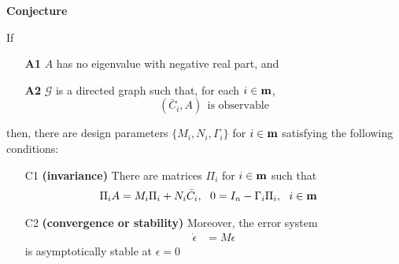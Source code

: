 \documentclass{beamer}
\begin{document}
\begin{frame}{\color{blue}\bf Conjecture }

If
\begin{itemize}
  \item [\bf A1] $A$ has no eigenvalue with negative real part, and
  \item [\bf A2] $\mathcal{G}$ is a directed graph such that, for each $i\in{\bf m}$,
\begin{equation*}
(\bar{C}_{i},A)  ~~\text{is observable}
\end{equation*}
\end{itemize}
then, there are design parameters $\{M_{i},N_{i},\Gamma_{i}\}$ for $i\in{\bf m}$ satisfying the following conditions:
\begin{itemize}
  \item [C1] \textbf{(invariance)} There are matrices $\Pi_{i}$ for $i\in{\bf m}$ such that
\begin{align*}
\Pi_{i}A&=M_{i}\Pi_{i}+ N_{i}\bar{C}_{i},~~ 0=I_{n}-\Gamma_{i}\Pi_{i},~~ i\in{\bf m}
\end{align*}
  \item [C2] \textbf{(convergence or stability)} Moreover, the error system
\begin{align*}
\dot{\epsilon}&=M \epsilon
\end{align*}
is asymptotically stable at $\epsilon=0$
\end{itemize}

\end{frame}
\end{document}
